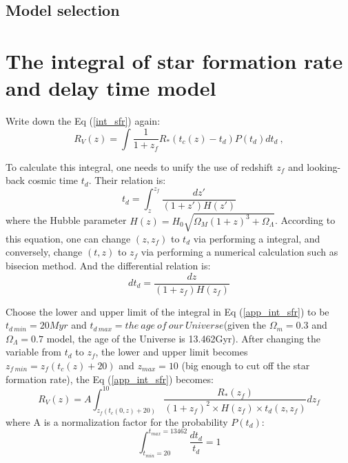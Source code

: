 \documentclass[11pt, a4paper]{article}
\begin{document}



\subsection{Model selection}







 






















\appendix
\section{The integral of star formation rate and delay time model}\label{app_sfr}
\quad

Write down the Eq (\ref{int_sfr}) again:
\begin{equation}\label{app_int_sfr}
R_V(z)=\int \frac{1}{1+z_f} R_*(t_c(z)-t_d)P(t_d)dt_d~,
\end{equation}

To calculate this integral, one needs to unify the use of redshift $z_f$ and looking-back cosmic time $t_d$.  Their relation is:
\begin{equation}
t_d=\int_z^{z_f}\frac{dz'}{(1+z')H(z')}
\end{equation}
where the Hubble parameter $H(z)=H_0\sqrt{\Omega_M(1+z)^3+\Omega_\Lambda}$. According to this equation, one can change $(z,z_f)$ to $t_d$ via performing a integral, and conversely, change $(t,z)$ to $z_f$ via performing a numerical calculation such as bisecion method. And the differential relation is:
\begin{equation}
dt_d=\frac{dz}{(1+z_f)H(z_f)}
\end{equation}

Choose the lower and upper limit of the integral in Eq (\ref{app_int_sfr}) to be $t_{d~min}=20Myr$ and $t_{d~max}=the~age~of~our~Universe $(given the $\Omega_m=0.3$ and $\Omega_\Lambda=0.7 $ model, the age of the Universe is 13.462Gyr). After changing the variable from $t_d$ to $z_f$, the lower and upper limit becomes $z_{f~min}=z_f(t_c(z)+20)$ and $z_{max}=10$ (big enough to cut off the star formation rate), the Eq (\ref{app_int_sfr}) becomes:
\begin{equation}
R_V(z)=A\int_{z_f(t_c(0,z)+20)}^{10}\frac{R_*(z_f)}{(1+z_f)^2\times H(z_f)\times t_d(z,z_f)}dz_f
\end{equation}
where A is a normalization factor for the probability $P(t_d)$:
\begin{equation}
\int_{t_{min}=20}^{t_{max}=13462}\frac{dt_d}{t_d}=1
\end{equation}
\end{document}
